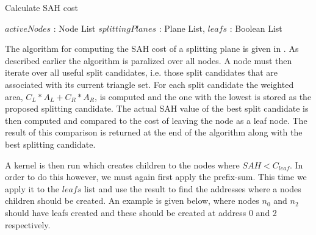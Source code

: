 \begin{algorithm}
  \caption{Calculate SAH cost}
  \label{alg:calcSAHCost}
  \begin{algorithmic}
              {$activeNodes$ : Node List}
              {$splittingPlanes$ : Plane List, $leafs$ : Boolean List}{
                  \ENDFOR
                \ENDFOR
              }
  \end{algorithmic}
\end{algorithm}


The algorithm for computing the SAH cost of a splitting plane is given in
. As described earlier the algorithm is paralized over
all nodes. A node must then iterate over all useful split candidates, i.e. those
split candidates that are associated with its current triangle set. For each
split candidate the weighted area, $C_L * A_L + C_R * A_R$, is computed and the
one with the lowest is stored as the proposed splitting candidate. The actual
SAH value of the best split candidate is then computed and compared to the cost
of leaving the node as a leaf node. The result of this comparison is returned at
the end of the algorithm along with the best splitting candidate.


A kernel is then run which creates children to the nodes where $SAH <
C_{leaf}$. In order to do this however, we must again first apply the
prefix-sum. This time we apply it to the $leafs$ list and use the result to find
the addresses where a nodes children should be created. An example is given
below, where nodes $n_0$ and $n_2$ should have leafs created and these should be
created at address 0 and 2 respectively.

